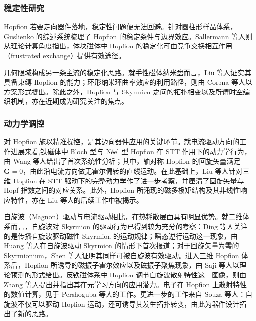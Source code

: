 \documentclass{article}
\begin{document}
\subsubsection*{稳定性研究}
Hopfion 若要走向器件落地，稳定性问题便无法回避。针对圆柱形样品体系，Guslienko 的综述系统梳理了 Hopfion 的稳定条件与边界效应\cite{guslienko2024review}。Sallermann 等人则从理论计算角度指出，体块磁体中 Hopfion 的稳定化可由竞争交换相互作用（frustrated exchange）提供有效途径\cite{sallermann2023stability}。

几何限域构成另一条主流的稳定化思路。就手性磁体纳米盘而言，Liu 等人证实其具备束缚 Hopfion 的能力\cite{liu2018binding}；环形纳米环曲率效应的利用路径，则由 Corona 等人以方案形式提出\cite{corona2023curvature}。除此之外，Hopfion 与 Skyrmion 之间的拓扑相变\cite{gao2024topological,souza2025topological}以及所谓时空编织机制\cite{knapman2024spacetime}，亦在近期成为研究关注的焦点。

\subsubsection*{动力学调控}
对 Hopfion 施以精准操控，是其迈向器件应用的关键环节。就电流驱动方向的工作进展来看,铁磁体中 Bloch 型与 N\'{e}el 型 Hopfion 在 STT 作用下的动力学行为，由 Wang 等人给出了首次系统性分析\cite{wang2019current}；其中，轴对称 Hopfion 的回旋矢量满足 $\mathbf{G} = 0$，由此沿电流方向做无霍尔偏转的直线运动。在此基础上，Liu 等人针对三维 Hopfion 在 STT 驱动下的完整动力学作了进一步考察，并厘清了回旋矢量与 Hopf 指数之间的对应关系\cite{liu2020three}。此外，Hopfion 所涌现的磁多极矩结构及其非线性响应特性，亦在 Liu 等人的后续工作中被揭示\cite{liu2022emergent}。

自旋波（Magnon）驱动与电流驱动相比，在热耗散层面具有明显优势。就二维体系而言，自旋波对 Skyrmion 的驱动行为已得到较为充分的考察：Ding 等人关注的是传播自旋波驱动磁性 Skyrmion 的运动规律\cite{ding2015motion}；瞬态逆行运动这一现象，由 Huang 等人在自旋波驱动 Skyrmion 的情形下首次报道\cite{huang2023transient}；对于回旋矢量为零的 Skyrmionium，Shen 等人证明其同样可被自旋波有效驱动\cite{shen2018skyrmionium}。进入三维 Hopfion 体系后，Hopfion 所诱导的磁振子霍尔效应以及磁振子聚焦现象，由 Saji 等人以理论预测的形式给出\cite{saji2023magnonic}。反铁磁体系中 Hopfion 调节自旋波散射特性这一图像，则由 Zhang 等人提出并指出其在元学习方向的应用潜力\cite{zhang2023magnon}。电子在 Hopfion 上散射特性的数值计算，见于 Pershoguba 等人的工作\cite{pershoguba2021electronic}。更进一步的工作来自 Souza 等人：自旋波不仅可以驱动 Hopfion 运动，还可诱导其发生拓扑转变\cite{souza2025topological}，由此为器件设计拓出了新的思路。
\end{document}
